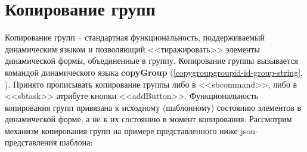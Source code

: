 \documentclass[../index.tex]{subfiles}
\begin{document}
\section{Копирование групп}
Копирование групп -- стандартная функциональность, поддерживаемый динамическим языком и позволяющий <<тиражировать>> элементы динамической формы, объединенные в группу. Копирование группы вызывается командой динамического языка \textbf{copyGroup} (\autoref{copygroupgroupid-id-group-string}, ). Принято прописывать копирование группы либо в <<sbcommand>>, либо в <<sbtask>> атрибуте кнопки <<addButton>>.
Функциональность копирования групп привязана к исходному (шаблонному) состоянию элементов в динамической форме, а не к их состоянию в момент копирования.
Рассмотрим механизм копирования групп на примере представленного ниже json-представления шаблона:
\end{document}
